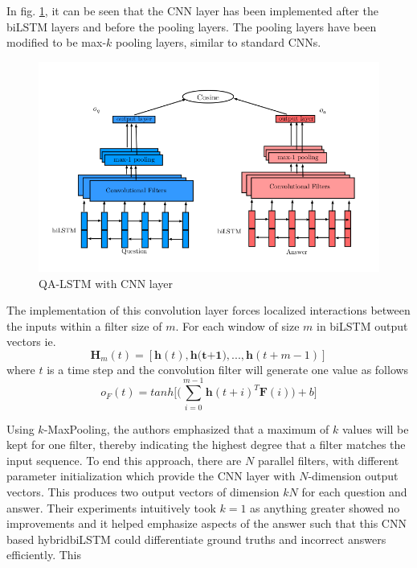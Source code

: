 \documentclass[12pt]{report}
\begin{document}
            In fig. \ref{lstmhaigcnn}, it can be seen that the CNN layer has been implemented after the biLSTM layers and before the pooling layers. The pooling layers have been modified to be max-$ k $ pooling layers, similar to standard CNNs.
            \begin{figure}
                \centering
                \includegraphics[scale=0.35]{../images/lstm-bilstmhaigcnn.png}
                \caption{QA-LSTM with CNN layer \citep{lstmhaighextractive}}\label{lstmhaigcnn}
            \end{figure}

            The implementation of this convolution layer forces localized interactions between the inputs within a filter size of $ m $. For each window of size $ m $ in biLSTM output vectors ie.
            \begin{equation}
            \textbf{H}_{m}(t)=[\textbf{h}(t), \textbf{h(t+1)},...,\textbf{h}(t+m-1)]
            \end{equation}
            where $ t $ is a time step and the convolution filter will generate one value as follows
            \begin{equation}
                o_{F}(t) = tanh \bigg[\bigg(\sum_{i=0}^{m-1}\textbf{h}(t+i)^{T}\textbf{F}(i)\bigg)+b\bigg]
            \end{equation}

            Using $ k $-MaxPooling, the authors emphasized that a maximum of $ k $ values will be kept  for one filter, thereby indicating the highest degree that a filter matches the input sequence. To end this approach, there are $ N $ parallel filters, with different parameter initialization which provide the CNN layer with $ N $-dimension output vectors. This produces two output vectors of dimension $ kN $ for each question and answer.  Their experiments intuitively took $k=1$ as anything greater showed no improvements and it helped emphasize aspects of the answer such that this CNN based hybridbiLSTM could differentiate ground truths and incorrect answers efficiently.
            This
            \cite{lstmhu2016question}
\end{document}
